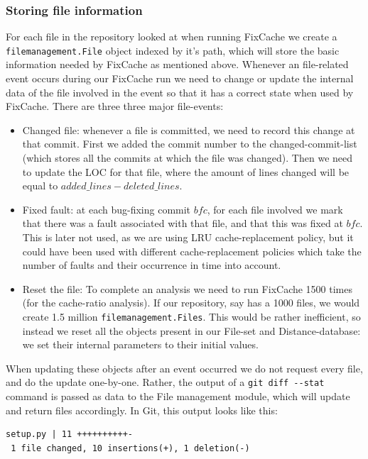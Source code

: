 \documentclass[12pt,twoside,notitlepage]{report}
\newcommand{\fxch}{FixCache}
\begin{document}
\subsubsection*{Storing file information}
For each file in the repository looked at when running \fxch{} we create a \texttt{filemanagement.File} object indexed by it's path, which will store the basic information needed by \fxch{} as mentioned above. Whenever an file-related event occurs during our \fxch{} run we need to change or update the internal data of the file involved in the event so that it has a correct state when used by \fxch{}. There are three three major file-events:
\begin{itemize}
\item Changed file: whenever a file is committed, we need to record this change at that commit. First we added the commit number to the changed-commit-list (which stores all the commits at which the file was changed). Then we need to update the LOC for that file, where the amount of lines changed will be equal to $added\_lines - deleted\_lines$.
\item Fixed fault: at each bug-fixing commit $bfc$, for each file involved we mark that there was a fault associated with that file, and that this was fixed at $bfc$. This is later not used, as we are using LRU cache-replacement policy, but it could have been used with different cache-replacement policies which take the number of faults and their occurrence in time into account.
\item Reset the file: To complete an analysis we need to run \fxch{} 1500 times (for the cache-ratio analysis). If our repository, say has a 1000 files, we would create 1.5 million \texttt{filemanagement.Files}. This would be rather inefficient, so instead we reset all the objects present in our File-set and Distance-database: we set their internal parameters to their initial values.
\end{itemize}

When updating these objects after an event occurred we do not request every file, and do the update one-by-one. Rather, the output of a \texttt{git diff -{}-stat} command is passed as data to the File management module, which will update and return files accordingly. In Git, this output looks like this:
\vspace{0.2in}
\begin{lstlisting}
setup.py | 11 ++++++++++-
 1 file changed, 10 insertions(+), 1 deletion(-)
\end{lstlisting}
\end{document}

